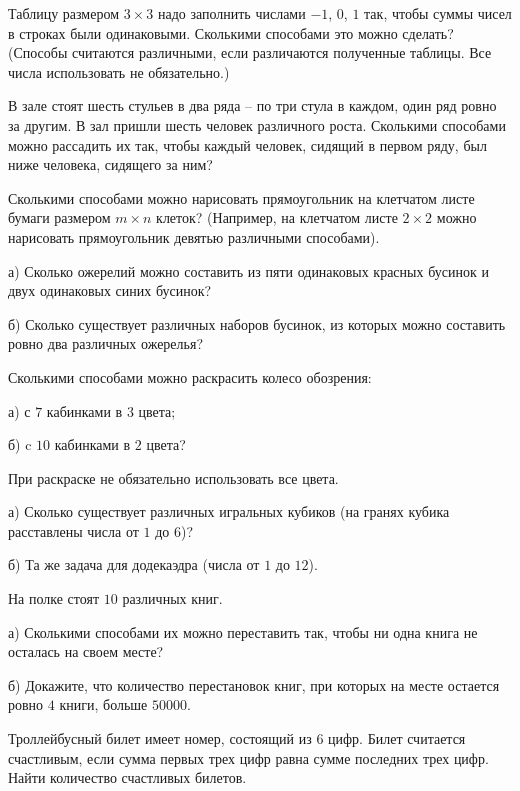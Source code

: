 \resetproblem \begingroup %
    \def\jeolmdate{19 октября 2018 г.}%
\jeolmheader \endgroup


\begin{problems}

\item Таблицу размером $3\times3$ надо заполнить числами $-1$, $0$, $1$ так, чтобы суммы чисел в строках были одинаковыми. Сколькими способами это можно сделать? (Способы считаются различными, если различаются полученные таблицы. Все числа использовать не обязательно.) %

\item В зале стоят шесть стульев в два ряда – по три стула в каждом, один ряд ровно за другим. В зал пришли шесть человек различного роста. Сколькими способами можно рассадить их так, чтобы каждый человек, сидящий в первом ряду, был ниже человека, сидящего за ним? %

\item Сколькими способами можно нарисовать прямоугольник на клетчатом листе бумаги размером $m \times n$ клеток? (Например, на клетчатом листе $2\times 2$  можно нарисовать прямоугольник девятью различными способами). 

\item а) Сколько ожерелий можно составить из пяти одинаковых красных бусинок и двух одинаковых синих бусинок?

б) Сколько существует различных наборов бусинок, из которых можно составить ровно два различных ожерелья?%

\item Сколькими способами можно раскрасить колесо обозрения:

а) с $7$ кабинками в $3$ цвета; %

б) c $10$ кабинками в $2$ цвета? %

При раскраске не обязательно использовать все цвета.

\item а) Сколько существует различных игральных кубиков (на гранях кубика расставлены числа от $1$ до $6$)? %

б) Та же задача для додекаэдра (числа от $1$ до $12$). %

\item На полке стоят $10$ различных книг. 

а) Сколькими способами их можно переставить так, чтобы ни одна книга не осталась на своем месте?

б) Докажите, что количество перестановок книг, при которых на месте остается ровно $4$ книги, больше $50 000$.

\item Троллейбусный билет имеет номер, состоящий из $6$ цифр. Билет считается счастливым, если сумма первых трех цифр равна сумме последних трех цифр. Найти количество счастливых билетов. %



\end{problems}